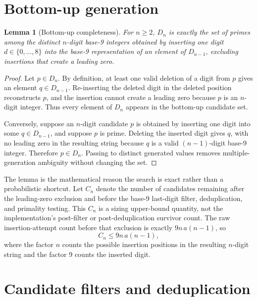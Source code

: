 \documentclass[11pt]{article}
\newtheorem{lemma}{Lemma}
\theoremstyle{definition}
\theoremstyle{remark}
\begin{document}
\section{Bottom-up generation}
\label{sec:bottom-up}

\begin{lemma}[Bottom-up completeness]
\label{lem:bottom-up}
For \(n\geq 2\), \(D_n\) is exactly the set of primes among the distinct
\(n\)-digit base-9 integers obtained by inserting one digit
\(d\in\{0,\ldots,8\}\) into the base-9 representation of an element of
\(D_{n-1}\), excluding insertions that create a leading zero.
\end{lemma}

\begin{proof}
Let \(p\in D_n\).  By definition, at least one valid deletion of a digit
from \(p\) gives an element \(q\in D_{n-1}\).  Re-inserting the deleted digit
in the deleted position reconstructs \(p\), and the insertion cannot create a
leading zero because \(p\) is an \(n\)-digit integer.  Thus every element of
\(D_n\) appears in the bottom-up candidate set.

Conversely, suppose an \(n\)-digit candidate \(p\) is obtained by inserting
one digit into some \(q\in D_{n-1}\), and suppose \(p\) is prime.  Deleting
the inserted digit gives \(q\), with no leading zero in the resulting string
because \(q\) is a valid \((n-1)\)-digit base-9 integer.  Therefore
\(p\in D_n\).  Passing to distinct generated values removes
multiple-generation ambiguity without changing the set.
\end{proof}

The lemma is the mathematical reason the search is exact rather than a
probabilistic shortcut.  Let \(C_n\) denote the number of candidates
remaining after the leading-zero exclusion and before the base-9 last-digit
filter, deduplication, and primality testing.  This \(C_n\) is a sizing
upper-bound quantity, not the implementation's post-filter or
post-deduplication survivor count.  The raw insertion-attempt count before
that exclusion is exactly \(9n\,a(n-1)\), so
\[
  C_n\le 9n\,a(n-1),
\]
where the factor \(n\) counts the possible insertion positions in the
resulting \(n\)-digit string and the factor \(9\) counts the inserted digit.

\section{Candidate filters and deduplication}
\label{sec:filters}
\end{document}
